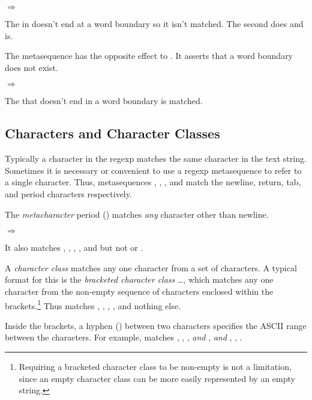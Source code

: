  $\Rightarrow$ 

The  in  doesn't end at a word boundary so it
isn't matched.  The second  does and is.

The metasequence  has the opposite effect to
.  It asserts that a word boundary does not
exist.

 $\Rightarrow$ 

The  that doesn't end in a word boundary is matched.

\subsection {Characters and Character Classes}

Typically a character in the regexp matches the same character in the
text string.  Sometimes it is necessary or convenient to use a regexp
metasequence to refer to a single character.  Thus, metasequences
, ,
, and   match the
newline, return, tab, and period characters respectively.

The \emph{metacharacter} period () matches \emph{any}
character other than newline.

 $\Rightarrow$ 

It also matches , , , , and
 but not  or .

A \emph{character class} matches any one character from a set of
characters. A typical format for this is the \emph{bracketed character
  class} \code{[}\ldots\code{]}, which matches any one character from
the non-empty sequence of characters enclosed within the
brackets.\footnote{Requiring a bracketed character class to be
  non-empty is not a limitation, since an empty character class can be
  more easily represented by an empty string.}  Thus
 matches , , ,
,  and nothing else.

Inside the brackets, a hyphen (\code{-}) between two characters
specifies the ASCII range between the characters.  For example,
 matches , , ,
\emph{and} , \emph{and} , , .

